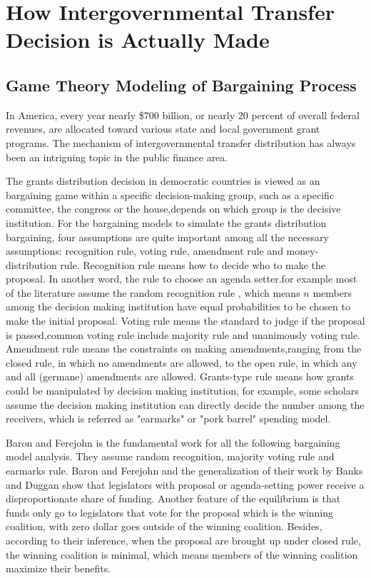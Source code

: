 \section{How Intergovernmental Transfer Decision is Actually Made}

\subsection{Game Theory Modeling of Bargaining Process}
In America, every year nearly \$700 billion, or nearly 20 percent of overall federal revenues, are allocated toward various state and local government grant programs. The mechanism of intergovernmental transfer distribution has always been an intriguing topic in the public finance area. 

The grants distribution decision in democratic countries is viewed as an bargaining game within a specific decision-making group, such as a specific committee, the congress or the house,depends on which group is the decisive institution. For the bargaining models to simulate the grants distribution bargaining, four assumptions are quite important among all the necessary assumptions: recognition rule, voting rule, amendment rule and money-distribution rule. Recognition rule means how to decide who to make the proposal. In another word, the rule to choose an agenda setter.for example most of the literature assume the random recognition rule \cite{kalandrakis2004three,anesi2015bargaining,diermeier2011legislative,rosenstiel2021congressional}, which means $n$ members among the decision making institution have equal probabilities to be chosen to make the initial proposal. Voting rule means the standard to judge if the proposal is passed,common voting rule include majority rule and unanimously voting rule. Amendment rule means the constraints on making amendments,ranging from the closed rule, in which no amendments are allowed, to the open rule, in which any and all (germane) amendments are allowed. Grants-type rule means how grants could be manipulated by decision making institution, for example, some scholars assume the decision making institution can directly decide the number among the receivers, which is referred as "earmarks" or "pork barrel" spending model.

Baron and Ferejohn \cite{baron1989bargaining} is the fundamental work for all the following bargaining model analysis. They assume random recognition, majority voting rule and earmarks rule. Baron and Ferejohn \cite{baron1989bargaining} and the generalization of their work by Banks and Duggan\cite{banks2006general} show that legislators with proposal or agenda-setting power receive a disproportionate share of funding. Another feature of the equilibrium is that funds only go to legislators that vote for the proposal which is the winning coalition, with zero dollar goes outside of the winning coalition. Besides, according to their inference, when the proposal are brought up under closed rule, the winning coalition is minimal, which means members of the winning coalition maximize their benefits.

